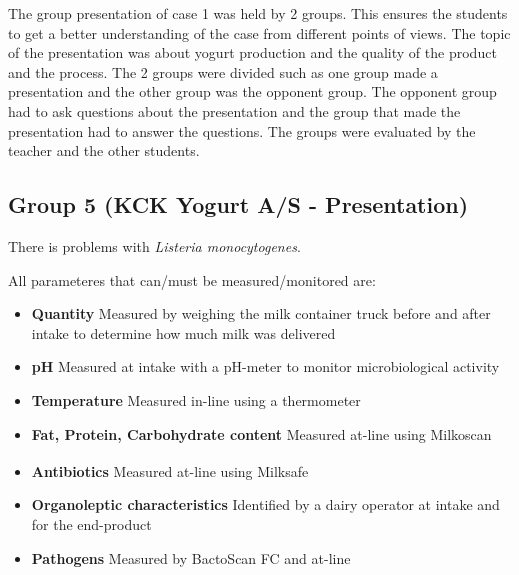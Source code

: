 The group presentation of case 1 was held by 2 groups. This ensures the students to get a better understanding of the case from different points of views. The topic of the presentation was about yogurt production and the quality of the product and the process. 
The 2 groups were divided such as one group made a presentation and the other group was the opponent group. The opponent group had to ask questions about the presentation and the group that made the presentation had to answer the questions. The groups were evaluated by the teacher and the other students.

\subsection{Group 5 (KCK Yogurt A/S - Presentation)}

There is problems with \textit{Listeria monocytogenes}.

All parameteres that can/must be measured/monitored are:
\begin{highlight}
    \begin{itemize}
        \item \textbf{Quantity}
        \subitem Measured by weighing the milk container truck before and after intake to determine how much milk was delivered
        \item \textbf{pH}
        \subitem Measured at intake with a pH-meter to monitor microbiological activity
        \item \textbf{Temperature}
        \subitem Measured in-line using a thermometer
        \item \textbf{Fat, Protein, Carbohydrate content}
        \subitem Measured at-line using Milkoscan
        \item \textbf{Antibiotics}
        \subitem Measured at-line using Milksafe\textsuperscript{}
        \item \textbf{Organoleptic characteristics}
        \subitem Identified by a dairy operator at intake and for the end-product
        \item \textbf{Pathogens}
        \subitem Measured by BactoScan FC and at-line
    \end{itemize}
\end{highlight}

